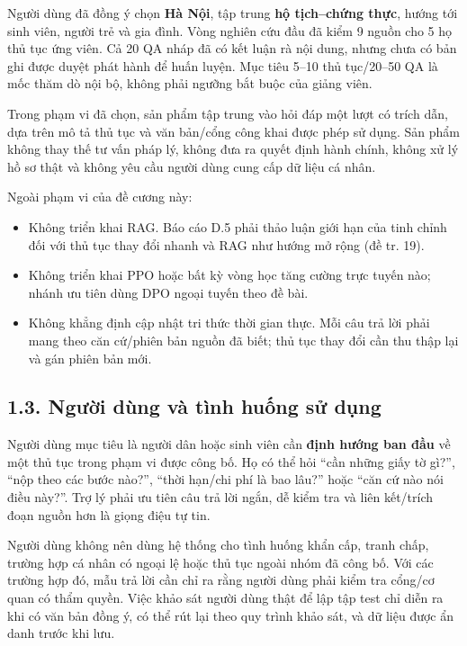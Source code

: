 \documentclass[11pt,a4paper]{article}
\providecommand{\tightlist}{\setlength{\itemsep}{0pt}\setlength{\parskip}{0pt}}
\begin{document}
Người dùng đã đồng ý chọn \textbf{Hà Nội}, tập trung \textbf{hộ
tịch--chứng thực}, hướng tới sinh viên, người trẻ và gia đình. Vòng
nghiên cứu đầu đã kiểm 9 nguồn cho 5 họ thủ tục ứng viên. Cả 20 QA nháp
đã có kết luận rà nội dung, nhưng chưa có bản ghi được duyệt phát hành
để huấn luyện. Mục tiêu 5--10 thủ tục/20--50 QA là mốc thăm dò nội bộ,
không phải ngưỡng bắt buộc của giảng viên.

Trong phạm vi đã chọn, sản phẩm tập trung vào hỏi đáp một lượt có trích
dẫn, dựa trên mô tả thủ tục và văn bản/cổng công khai được phép sử dụng.
Sản phẩm không thay thế tư vấn pháp lý, không đưa ra quyết định hành
chính, không xử lý hồ sơ thật và không yêu cầu người dùng cung cấp dữ
liệu cá nhân.

Ngoài phạm vi của đề cương này:

\begin{itemize}
\tightlist
\item
  Không triển khai RAG. Báo cáo D.5 phải thảo luận giới hạn của tinh
  chỉnh đối với thủ tục thay đổi nhanh và RAG như hướng mở rộng (đề tr.
  19).
\item
  Không triển khai PPO hoặc bất kỳ vòng học tăng cường trực tuyến nào;
  nhánh ưu tiên dùng DPO ngoại tuyến theo đề bài.
\item
  Không khẳng định cập nhật tri thức thời gian thực. Mỗi câu trả lời
  phải mang theo căn cứ/phiên bản nguồn đã biết; thủ tục thay đổi cần
  thu thập lại và gán phiên bản mới.
\end{itemize}

\subsection{1.3. Người dùng và tình huống sử
dụng}\label{ngux1b0ux1eddi-duxf9ng-vuxe0-tuxecnh-huux1ed1ng-sux1eed-dux1ee5ng}

Người dùng mục tiêu là người dân hoặc sinh viên cần \textbf{định hướng
ban đầu} về một thủ tục trong phạm vi được công bố. Họ có thể hỏi ``cần
những giấy tờ gì?'', ``nộp theo các bước nào?'', ``thời hạn/chi phí là
bao lâu?'' hoặc ``căn cứ nào nói điều này?''. Trợ lý phải ưu tiên câu
trả lời ngắn, dễ kiểm tra và liên kết/trích đoạn nguồn hơn là giọng điệu
tự tin.

Người dùng không nên dùng hệ thống cho tình huống khẩn cấp, tranh chấp,
trường hợp cá nhân có ngoại lệ hoặc thủ tục ngoài nhóm đã công bố. Với
các trường hợp đó, mẫu trả lời cần chỉ ra rằng người dùng phải kiểm tra
cổng/cơ quan có thẩm quyền. Việc khảo sát người dùng thật để lập tập
test chỉ diễn ra khi có văn bản đồng ý, có thể rút lại theo quy trình
khảo sát, và dữ liệu được ẩn danh trước khi lưu.
\end{document}
